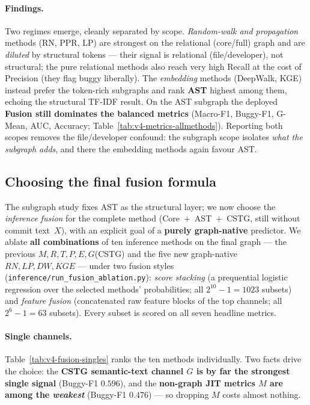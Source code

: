\documentclass[11pt,a4paper]{article}
\newcommand{\code}[1]{\texttt{#1}}
\begin{document}
	\paragraph{Findings.} Two regimes emerge, cleanly separated by scope.
	\emph{Random-walk and propagation} methods (RN, PPR, LP) are strongest on the
	relational (core/full) graph and are \emph{diluted} by structural tokens --- their
	signal is relational (file/developer), not structural; the pure relational
	methods also reach very high Recall at the cost of Precision (they flag buggy
	liberally). The \emph{embedding} methods (DeepWalk, KGE) instead prefer the
	token-rich subgraphs and rank \textbf{AST} highest among them, echoing the
	structural TF-IDF result. On the AST subgraph the deployed \textbf{Fusion still
	dominates the balanced metrics} (Macro-F1, Buggy-F1, G-Mean, AUC, Accuracy;
	Table~\ref{tab:v4-metrics-allmethods}). Reporting both scopes removes the
	file/developer confound: the subgraph scope isolates \emph{what the subgraph
	adds}, and there the embedding methods again favour AST.

	\subsection{Choosing the final fusion formula}\label{sec:v4-fusionablation}
	The subgraph study fixes AST as the structural layer; we now choose the
	\emph{inference fusion} for the complete method (Core~$+$~AST~$+$~CSTG, still
	without commit text~$X$), with an explicit goal of a \textbf{purely graph-native}
	predictor. We ablate \textbf{all combinations} of ten inference methods on the
	final graph --- the previous $M,R,T,P,E,G$(CSTG) and the five new graph-native
	$RN,LP,DW,KGE$ --- under two fusion styles (\code{inference/run\_fusion\_ablation.py}):
	\emph{score stacking} (a prequential logistic regression over the selected
	methods' probabilities; all $2^{10}-1=1023$ subsets) and \emph{feature fusion}
	(concatenated raw feature blocks of the top channels; all $2^{6}-1=63$ subsets).
	Every subset is scored on all seven headline metrics.

	\paragraph{Single channels.} Table~\ref{tab:v4-fusion-singles} ranks the ten
	methods individually. Two facts drive the choice: the \textbf{CSTG semantic-text
	channel $G$ is by far the strongest single signal} (Buggy-F1 $0.596$), and the
	\textbf{non-graph JIT metrics $M$ are among the \emph{weakest}} (Buggy-F1
	$0.476$) --- so dropping $M$ costs almost nothing.
\end{document}
